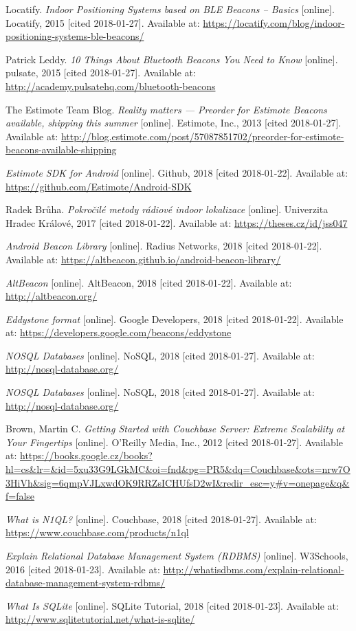 \begin{thebibliography}{10}
Locatify. \textit{Indoor Positioning Systems based on BLE Beacons – Basics} [online]. Locatify, 2015 [cited 2018-01-27]. Available at: \url{https://locatify.com/blog/indoor-positioning-systems-ble-beacons/}

Patrick Leddy. \textit{10 Things About Bluetooth Beacons You Need to Know} [online]. pulsate, 2015 [cited 2018-01-27]. Available at: \url{http://academy.pulsatehq.com/bluetooth-beacons}

The Estimote Team Blog. \textit{Reality matters — Preorder for Estimote Beacons available, shipping this summer} [online]. Estimote, Inc., 2013 [cited 2018-01-27]. Available at: \url{http://blog.estimote.com/post/57087851702/preorder-for-estimote-beacons-available-shipping}

\textit{Estimote SDK for Android} [online]. Github, 2018 [cited 2018-01-22]. Available at: \url{https://github.com/Estimote/Android-SDK}

Radek Brůha. \textit{Pokročilé metody rádiové indoor lokalizace} [online]. Univerzita Hradec Králové, 2017 [cited 2018-01-22]. Available at: \url{https://theses.cz/id/jss047}

\textit{Android Beacon Library} [online]. Radius Networks, 2018 [cited 2018-01-22]. Available at: \url{https://altbeacon.github.io/android-beacon-library/}

\textit{AltBeacon} [online]. AltBeacon, 2018 [cited 2018-01-22]. Available at: \url{http://altbeacon.org/}

\textit{Eddystone format} [online]. Google Developers, 2018 [cited 2018-01-22]. Available at: \url{https://developers.google.com/beacons/eddystone}

\textit{NOSQL Databases} [online]. NoSQL, 2018 [cited 2018-01-27]. Available at: \url{http://nosql-database.org/}

\textit{NOSQL Databases} [online]. NoSQL, 2018 [cited 2018-01-27]. Available at: \url{http://nosql-database.org/}

Brown, Martin C. \textit{Getting Started with Couchbase Server: Extreme Scalability at Your Fingertips} [online]. O'Reilly Media, Inc., 2012 [cited 2018-01-27]. Available at: \url{https://books.google.cz/books?hl=cs&lr=&id=5xu33G9LGkMC&oi=fnd&pg=PR5&dq=Couchbase&ots=nrw7O3HiVh&sig=6qmpVJLxwdOK9RRZsICHUfsD2wI&redir_esc=y#v=onepage&q&f=false}

\textit{What is N1QL?} [online]. Couchbase, 2018 [cited 2018-01-27]. Available at: \url{https://www.couchbase.com/products/n1ql}

\textit{Explain Relational Database Management System (RDBMS)} [online]. W3Schools, 2016 [cited 2018-01-23]. Available at: \url{http://whatisdbms.com/explain-relational-database-management-system-rdbms/}

\textit{What Is SQLite} [online]. SQLite Tutorial, 2018 [cited 2018-01-23]. Available at: \url{http://www.sqlitetutorial.net/what-is-sqlite/}

\end{thebibliography}